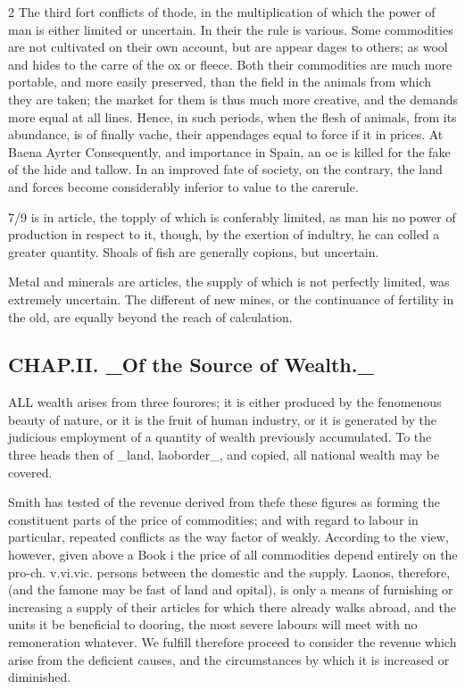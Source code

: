 \documentclass[10pt]{article}
\begin{document}
\begin{multicols}{2}
The third fort conflicts of thode, in the multiplication of which the power of man is either limited or uncertain. In their the rule is various. Some commodities are not cultivated on their own account, but are appear dages to others; as wool and hides to the carre of the ox or fleece. Both their commodities are much more portable, and more easily preserved, than the field in the animals from which they are taken; the market for them is thus much more creative, and the demands more equal at all lines. Hence, in such periods, when the flesh of animals, from its abundance, is of finally vache, their appendages equal to force if it in prices. At Baena Ayrter Consequently, and importance in Spain, an oe is killed for the fake of the hide and tallow. In an improved fate of society, on the contrary, the land and forces become considerably inferior to value to the carerule.

7/9 is in article, the topply of which is conferably limited, as man his no power of production in respect to it, though, by the exertion of indultry, he can colled a greater quantity. Shoals of fish are generally copions, but uncertain.

Metal and minerals are articles, the supply of which is not perfectly limited, was extremely uncertain. The different of new mines, or the continuance of fertility in the old, are equally beyond the reach of calculation.

\subsection*{CHAP.II. \_Of the Source of Wealth.\_}
ALL wealth arises from three fourores; it is either produced by the fenomenous beauty of nature, or it is the fruit of human industry, or it is generated by the judicious employment of a quantity of wealth previously accumulated. To the three heads then of \_land, laoborder\_, and copied, all national wealth may be covered.

Smith has tested of the revenue derived from thefe these figures as forming the constituent parts of the price of commodities; and with regard to labour in particular, repeated conflicts as the way factor of weakly. According to the view, however, given above a Book i the price of all commodities depend entirely on the pro-ch. v.vi.vic. persons between the domestic and the supply. Laonos, therefore, (and the famone may be fast of land and opital), is only a means of furnishing or increasing a supply of their articles for which there already walks abroad, and the units it be beneficial to dooring, the most severe labours will meet with no remoneration whatever. We fulfill therefore proceed to consider the revenue which arise from the deficient causes, and the circumstances by which it is increased or diminished.


\end{multicols}
\end{document}
